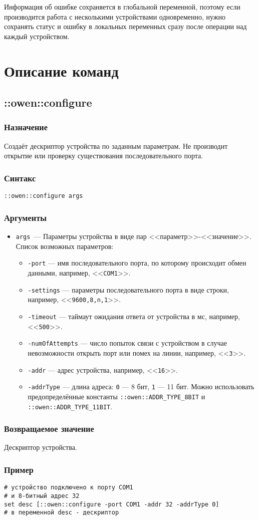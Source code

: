 \documentclass[12pt, a4paper]{article}
\newcommand{\EXAMPLE}{\subsubsection*{Пример}}
\newcommand{\PURPOSE}{\subsubsection*{Назначение}}
\newcommand{\SYNTAX}[1]{\subsubsection*{Синтакс}{\tt #1}}
\newcommand{\ARGUMENTS}{\subsubsection*{Аргументы}}
\newcommand{\RETURN}{\subsubsection*{Возвращаемое значение}}
\newcommand{\COMMAND}[1]{\subsection{#1}\label{#1}}
\newcommand{\BEGINARGUMENTS}{\ARGUMENTS\begin{itemize}}
\newcommand{\ENDARGUMENTS}{\end{itemize}}
\newcommand{\ARGUMENT}[1]{\item {\tt \mbox{#1}}~---}
\begin{document}
Информация об ошибке сохраняется в глобальной переменной, поэтому если производится работа с несколькими устройствами одновременно, нужно сохранять статус и ошибку в локальных переменных сразу после операции над каждый устройством.

\section{Описание команд}

\COMMAND{::owen::configure}

\PURPOSE

Создаёт дескриптор устройства по заданным параметрам. Не производит открытие или проверку существования последовательного порта.

\SYNTAX{::owen::configure args}

\BEGINARGUMENTS
\ARGUMENT{args} Параметры устройства в виде пар <<параметр>>-<<значение>>. Список возможных параметров:

\begin{itemize}
\item {\tt -port} --- имя последовательного порта, по которому происходит обмен данными, например, <<{\tt COM1}>>.
\item {\tt -settings} --- параметры последовательного порта в виде строки, например, <<{\tt 9600,8,n,1}>>.
\item {\tt -timeout} --- таймаут ожидания ответа от устройства в мс, например, <<{\tt 500}>>.
\item {\tt -numOfAttempts} --- число попыток связи с устройством в случае невозможности открыть порт или помех на линии, например, <<{\tt 3}>>.
\item {\tt -addr} --- адрес устройства, например, <<{\tt 16}>>.
\item {\tt -addrType} --- длина адреса: {\tt 0} --- 8 бит, {\tt 1} --- 11 бит. Можно использовать предопределённые константы {\tt ::owen::ADDR\_TYPE\_8BIT} и {\tt ::owen::ADDR\_TYPE\_11BIT}.
\end{itemize}

\ENDARGUMENTS

\RETURN

Дескриптор устройства.

\EXAMPLE

\begin{verbatim} 
# устройство подключено к порту COM1
# и 8-битный адрес 32
set desc [::owen::configure -port COM1 -addr 32 -addrType 0]
# в переменной desc - дескриптор
\end{verbatim} 
\end{document}
